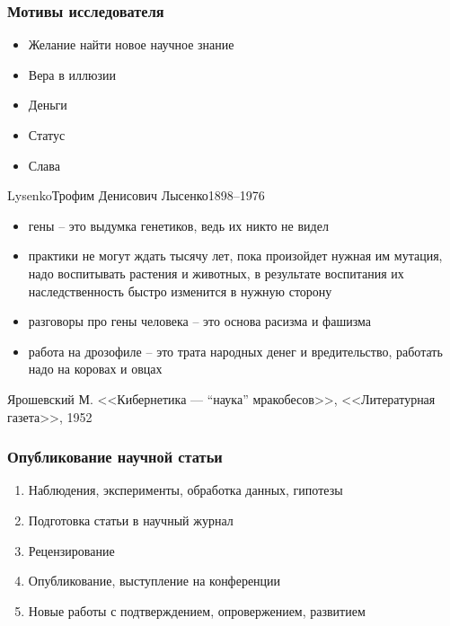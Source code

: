 \documentclass[aspectratio=169]{beamer}
\begin{document}
\begin{bframe}\frametitle{Мотивы исследователя}
\begin{itemize}
\item<+-> Желание найти новое научное знание
\item<+-> Вера в иллюзии
\item<+-> Деньги
\item<+-> Статус
\item<+-> Слава
\end{itemize}
\end{bframe}



\begin{Person}{Lysenko}{Трофим Денисович Лысенко}{1898--1976}
\begin{itemize}
\item  гены -- это выдумка генетиков, ведь их никто не видел
\item  практики не могут ждать тысячу лет, пока произойдет нужная им мутация, 
надо воспитывать растения и животных, в результате воспитания их наследственность 
быстро изменится в нужную сторону
\item разговоры про гены человека -- это основа расизма и фашизма
\item  работа на дрозофиле -- это трата народных денег и вредительство, 
работать надо на коровах и овцах
\end{itemize}
\end{Person}


\begin{bframe}
{
Ярошевский М. <<Кибернетика — ``наука'' мракобесов>>, <<Литературная газета>>, 1952
}
\end{bframe}

\begin{bframe}\frametitle{Опубликование научной статьи}
\begin{enumerate}
\item<+-> Наблюдения, эксперименты, обработка данных, гипотезы
\item<+-> Подготовка статьи в научный журнал
\item<+-> Рецензирование
\item<+-> Опубликование, выступление на конференции
\item<+-> Новые работы с подтверждением, опровержением, развитием
\end{enumerate}
\end{bframe}
\end{document}
